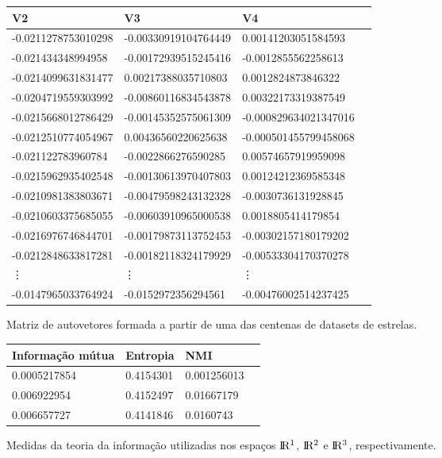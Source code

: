 \documentclass{article}
\begin{document}
        \begin{center}
            \begin{tabular}{llll}
                V2         & V3         & V4         \\
                \hline
                -0.0211278753010298 & -0.00330919104764449 & 0.00141203051584593 \\
                -0.021434348994958 & -0.00172939515245416 & -0.0012855562258613 \\
                -0.0214099631831477 & 0.00217388035710803 & 0.0012824873846322 \\
                -0.0204719559303992 & -0.00860116834543878 & 0.00322173319387549 \\
                -0.0215668012786429 & -0.00145352575061309 & -0.000829634021347016 \\
                -0.0212510774054967 & 0.00436560220625638 & -0.000501455799458068 \\
                -0.021122783960784 & -0.0022866276590285 & 0.00574657919959098 \\
                -0.0215962935402548 & -0.00130613970407803 & 0.00124212369585348 \\
                -0.0210981383803671 & -0.00479598243132328 & -0.0030736131928845 \\
                -0.0210603375685055 & -0.00603910965000538 & 0.0018805414179854 \\
                -0.0216976746844701 & -0.00179873113752453 & -0.00302157180179202 \\
                -0.0212848633817281 & -0.00182118324179929 & -0.00533304170370278 \\
                \vdots & \vdots & \vdots \\
                -0.0147965033764924 & -0.0152972356294561 & -0.00476002514237425
            \end{tabular}\par
            Matriz de autovetores formada a partir de uma das centenas de datasets de estrelas.
        \end{center}

        \begin{center}
            \begin{tabular}{llll}
                Informação mútua & Entropia & NMI \\
                \hline
                0.0005217854 & 0.4154301 & 0.001256013 \\
                0.006922954  & 0.4152497 & 0.01667179  \\
                0.006657727  & 0.4141846 & 0.0160743
            \end{tabular}\par
            Medidas da teoria da informação utilizadas nos espaços $\rm I\!R^{1}$, $\rm I\!R^{2}$ e $\rm I\!R^{3}$, respectivamente.
        \end{center}
\end{document}
